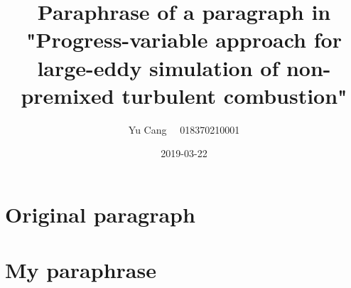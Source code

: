 \documentclass[paper=a4, fontsize=11pt]{scrartcl}
\title{Paraphrase of  a paragraph in "Progress-variable approach for large-eddy simulation of non-premixed turbulent combustion"}
\author{Yu Cang \ \ 018370210001}
\date{2019-03-22}
\begin{document}
\maketitle

\section{Original paragraph}

\section{My paraphrase}
\end{document}
